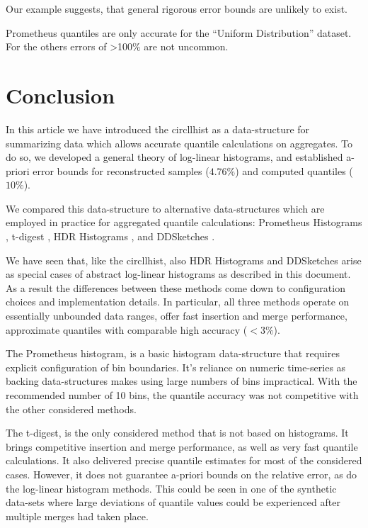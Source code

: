 \documentclass{article}
\theoremstyle{plain}
\theoremstyle{remark}
\begin{document}
Our example suggests, that general rigorous error bounds are unlikely to exist.

Prometheus quantiles are only accurate for the ``Uniform Distribution'' dataset.
For the others errors of >100\% are not uncommon.

\section{Conclusion}

In this article we have introduced the circllhist as a data-structure for summarizing data which
allows accurate quantile calculations on aggregates.  To do so, we developed a general theory of
log-linear histograms, and established a-priori error bounds for reconstructed samples ($4.76\%$)
and computed quantiles ($10\%$).

We compared this data-structure to alternative data-structures which are employed in practice for
aggregated quantile calculations: Prometheus Histograms \cite{prom}, t-digest \cite{tdigest}, HDR
Histograms \cite{hdr}, and DDSketches \cite{dd}.

We have seen that, like the circllhist, also HDR Histograms and DDSketches arise as special cases of
abstract log-linear histograms as described in this document. As a result the differences between
these methods come down to configuration choices and implementation details.  In particular, all
three methods operate on essentially unbounded data ranges, offer fast insertion and merge
performance, approximate quantiles with comparable high accuracy ($<3\%$).

The Prometheus histogram, is a basic histogram data-structure that requires explicit configuration
of bin boundaries. It's reliance on numeric time-series as backing data-structures makes using large
numbers of bins impractical. With the recommended number of 10 bins, the quantile accuracy was not
competitive with the other considered methods.

The t-digest, is the only considered method that is not based on histograms. It brings competitive
insertion and merge performance, as well as very fast quantile calculations. It also delivered
precise quantile estimates for most of the considered cases. However, it does not guarantee a-priori
bounds on the relative error, as do the log-linear histogram methods. This could be seen in one of
the synthetic data-sets where large deviations of quantile values could be experienced after
multiple merges had taken place.
\end{document}
